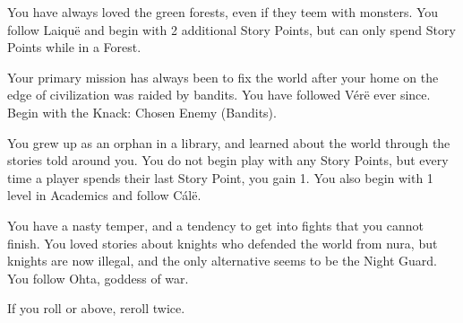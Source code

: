\begin{multicols}{2}
\begin{list}{\addtocounter{list}{1}\textbf{:}}{\raggedleft}
\item
You have always loved the green forests, even if they teem with monsters.
You follow Laiqu\"e and begin with 2 additional Story Points, but can only spend Story Points while in a Forest.

\item
Your primary mission has always been to fix the world after your home on the edge of civilization was raided by bandits.
You have followed V\'er\"e ever since.
Begin with the Knack: Chosen Enemy (Bandits).

\item
You grew up as an orphan in a library, and learned about the world through the stories told around you.
You do not begin play with any Story Points, but every time a player spends their  last Story Point, you gain 1.
You also begin with 1 level in Academics and follow C\'al\"e.

\item
You have a nasty temper, and a tendency to get into fights that you cannot finish.
You loved stories about knights who defended the world from nura, but knights are now illegal, and the only alternative seems to be the Night Guard.
You follow Ohta, goddess of war.

\item{If you roll  or above, reroll twice.}

\end{list}

\end{multicols}
